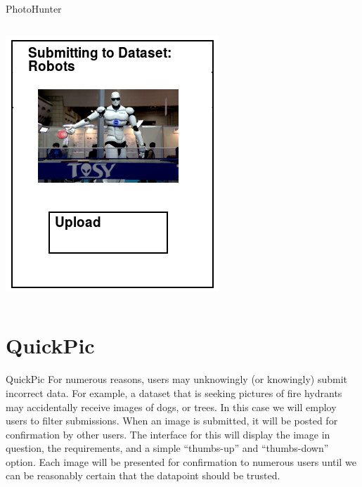 \documentclass[aspectratio=169]{beamer}
\begin{document}
\begin{frame}{PhotoHunter}
\begin{columns}[c]
\begin{column}{0.5\columnwidth}
      \includegraphics[width=\textwidth,height=\textheight,keepaspectratio]{ss_photohunter_upload}
    \end{column}
  \end{columns}
\end{frame}

\section{QuickPic}

\begin{frame}{QuickPic}
  For numerous reasons, users may unknowingly (or knowingly) submit
  incorrect data. For example, a dataset that is seeking pictures of
  fire hydrants may accidentally receive images of dogs, or trees. In
  this case we will employ users to filter submissions. When an image
  is
  submitted, it will be posted for confirmation by other users. The
  interface for this will display the image in question, the
  requirements, and a simple ``thumbs-up'' and ``thumbs-down'' option.
  Each image will be presented for confirmation to numerous users
  until
  we can be reasonably certain that the datapoint should be trusted.
\end{frame}
\end{document}
